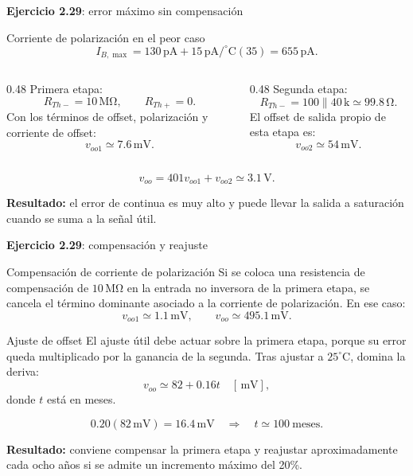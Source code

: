 \documentclass[aspectratio=169,9pt]{beamer}
\newcommand{\exercise}[1]{\textbf{Ejercicio #1}}
\newcommand{\result}[1]{\textbf{\color{eiTeal}Resultado:} #1}
\newcommand{\unit}[1]{\,\mathrm{#1}}
\begin{document}
\begin{frame}{\exercise{2.29}: error máximo sin compensación}
  \begin{block}{Corriente de polarización en el peor caso}
    \[
      I_{B,\max}=130\unit{pA}+15\unit{pA/^\circ C}(35)=655\unit{pA}.
    \]
  \end{block}

  \begin{columns}[T,onlytextwidth]
    \begin{column}{0.48\textwidth}
      Primera etapa:
      \[
        R_{Th-}=10\unit{M\Omega},\qquad R_{Th+}=0 .
      \]
      Con los términos de offset, polarización y corriente de offset:
      \[
        v_{oo1}\simeq 7.6\unit{mV}.
      \]
    \end{column}
    \begin{column}{0.48\textwidth}
      Segunda etapa:
      \[
        R_{Th-}=100\parallel 40\unit{k}\simeq 99.8\unit{\Omega}.
      \]
      El offset de salida propio de esta etapa es:
      \[
        v_{oo2}\simeq 54\unit{mV}.
      \]
    \end{column}
  \end{columns}

  \[
    v_{oo}=401v_{oo1}+v_{oo2}\simeq 3.1\unit{V}.
  \]

  \result{el error de continua es muy alto y puede llevar la salida a saturación cuando se suma a la señal útil.}
\end{frame}

\begin{frame}[shrink=8]{\exercise{2.29}: compensación y reajuste}
  \begin{block}{Compensación de corriente de polarización}
    Si se coloca una resistencia de compensación de \(10\unit{M\Omega}\) en la entrada no inversora de la primera etapa, se cancela el término dominante asociado a la corriente de polarización. En ese caso:
    \[
      v_{oo1}\simeq 1.1\unit{mV},\qquad
      v_{oo}\simeq 495.1\unit{mV}.
    \]
  \end{block}

  \begin{block}{Ajuste de offset}
    El ajuste útil debe actuar sobre la primera etapa, porque su error queda multiplicado por la ganancia de la segunda. Tras ajustar a \(25^\circ\mathrm{C}\), domina la deriva:
    \[
      v_{oo}\simeq 82+0.16t\quad [\unit{mV}],
    \]
    donde \(t\) está en meses.
  \end{block}

  \[
    0.20(82\unit{mV})=16.4\unit{mV}
    \quad\Rightarrow\quad
    t\simeq 100\ \text{meses}.
  \]

  \result{conviene compensar la primera etapa y reajustar aproximadamente cada ocho años si se admite un incremento máximo del 20\%.}
\end{frame}
\end{document}
